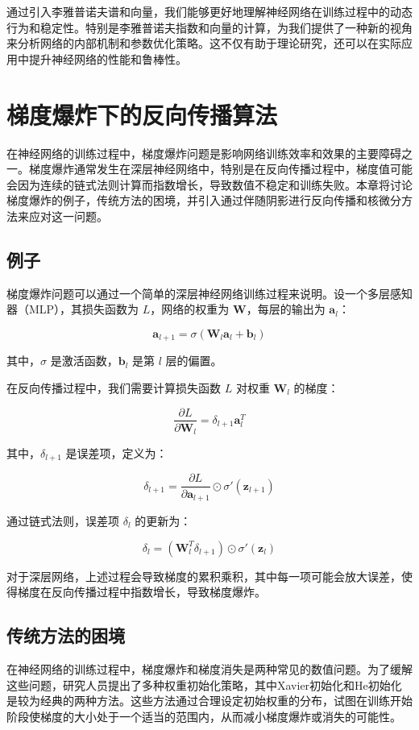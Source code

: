 \documentclass[12pt,a4paper]{amsart}
\begin{document}
通过引入李雅普诺夫谱和向量，我们能够更好地理解神经网络在训练过程中的动态行为和稳定性。特别是李雅普诺夫指数和向量的计算，为我们提供了一种新的视角来分析网络的内部机制和参数优化策略。这不仅有助于理论研究，还可以在实际应用中提升神经网络的性能和鲁棒性。

\section{梯度爆炸下的反向传播算法}

在神经网络的训练过程中，梯度爆炸问题是影响网络训练效率和效果的主要障碍之一。梯度爆炸通常发生在深层神经网络中，特别是在反向传播过程中，梯度值可能会因为连续的链式法则计算而指数增长，导致数值不稳定和训练失败。本章将讨论梯度爆炸的例子，传统方法的困境，并引入通过伴随阴影进行反向传播和核微分方法来应对这一问题。

\subsection{例子}

梯度爆炸问题可以通过一个简单的深层神经网络训练过程来说明。设一个多层感知器（MLP），其损失函数为 \( L \)，网络的权重为 \(\mathbf{W}\)，每层的输出为 \(\mathbf{a}_l\)：

\[ \mathbf{a}_{l+1} = \sigma(\mathbf{W}_l \mathbf{a}_l + \mathbf{b}_l) \]

其中，\(\sigma\) 是激活函数，\(\mathbf{b}_l\) 是第 \(l\) 层的偏置。

在反向传播过程中，我们需要计算损失函数 \(L\) 对权重 \(\mathbf{W}_l\) 的梯度：

\[ \frac{\partial L}{\partial \mathbf{W}_l} = \delta_{l+1} \mathbf{a}_l^T \]

其中，\(\delta_{l+1}\) 是误差项，定义为：

\[ \delta_{l+1} = \frac{\partial L}{\partial \mathbf{a}_{l+1}} \odot \sigma'(\mathbf{z}_{l+1}) \]

通过链式法则，误差项 \(\delta_l\) 的更新为：

\[ \delta_l = (\mathbf{W}_l^T \delta_{l+1}) \odot \sigma'(\mathbf{z}_l) \]

对于深层网络，上述过程会导致梯度的累积乘积，其中每一项可能会放大误差，使得梯度在反向传播过程中指数增长，导致梯度爆炸。

\subsection{传统方法的困境}

在神经网络的训练过程中，梯度爆炸和梯度消失是两种常见的数值问题。为了缓解这些问题，研究人员提出了多种权重初始化策略，其中Xavier初始化和He初始化是较为经典的两种方法。这些方法通过合理设定初始权重的分布，试图在训练开始阶段使梯度的大小处于一个适当的范围内，从而减小梯度爆炸或消失的可能性。
\end{document}
